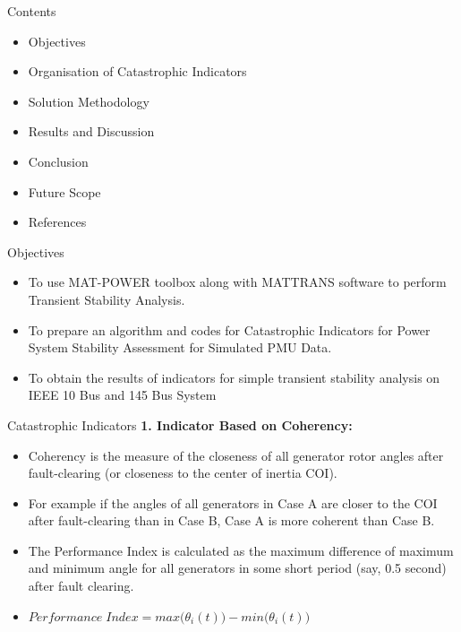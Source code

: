 \documentclass [xcolor=svgnames, t] {beamer}
\title[PG THESIS]{}
\subtitle{\large EVALUATION OF CATASTROPHIC INDICATORS FOR POWER SYSTEM STABILITY ASSESSMENT}
\author[Subha Biswal] %
{\small by \\ \large\textbf{Subha Biswal} \\ \small Power System Engineering \\ Dual Degree \\ (Reg. No. 1704050016)}
\institute[EE] %
{
\small Under the guidance of\\
\large \textbf{Dr. Rajat Kanti Samal}
}
\date[May 2022] %
{
Department of Electrical Engineering\\
Veer Surendra Sai University of Technology\\
Burla, Odisha – 768018
}
\begin{document}
\begin{frame}
\maketitle
\end{frame}







\begin{frame}{Contents}
\begin{itemize}
\item Objectives
\item Organisation of Catastrophic Indicators
\item Solution Methodology
\item Results and Discussion
\item Conclusion
\item Future Scope
\item References
\end{itemize}
\end{frame}

\begin{frame}{Objectives}
\begin{itemize}
\item To use MAT-POWER toolbox along with MATTRANS software to perform Transient Stability Analysis.
\item To prepare an algorithm and codes for Catastrophic Indicators for Power System Stability Assessment for Simulated PMU Data.
\item To obtain the results of indicators for simple transient stability analysis on IEEE 10 Bus and 145 Bus System
\end{itemize}
\end{frame}

\begin{frame}{Catastrophic Indicators}
\textbf{1. Indicator Based on Coherency:}
\begin{itemize}
\item Coherency is the measure of the closeness of all generator rotor angles after fault-clearing (or closeness to the center of inertia COI).
\item For example if the angles of all generators in Case A are closer to the COI after fault-clearing than in Case B, Case A is more coherent than Case B.
\item The Performance Index is calculated as the maximum difference of maximum and minimum angle for all generators in some short period (say, 0.5 second) after fault clearing.
\item $Performance \; Index = max\big(\theta_i(t)\big)-min\big(\theta_i(t)\big)$ 
\end{itemize}
\end{frame}
\end{document}

